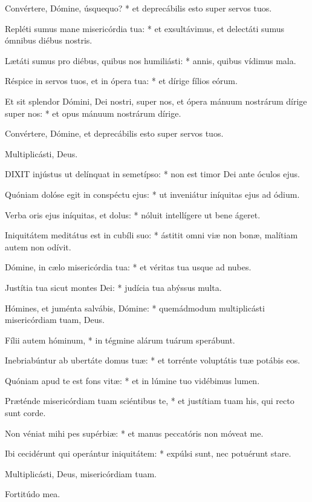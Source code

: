 Convértere, Dómine, úsquequo? * et deprecábilis esto super servos tuos.

Repléti sumus mane misericórdia tua: * et exsultávimus, et delectáti sumus ómnibus diébus nostris.

Lætáti sumus pro diébus, quibus nos humiliásti: * annis, quibus vídimus mala.

Réspice in servos tuos, et in ópera tua: * et dírige fílios eórum.

Et sit splendor Dómini, Dei nostri, super nos, et ópera mánuum nostrárum dírige super nos: * et opus mánuum nostrárum dírige.

 Convértere, Dómine, et deprecábilis esto super servos tuos.

 Multiplicásti, Deus.


\lettrine[lines=2]{D}{IXIT} injústus ut delínquat in semetípso: * non est timor Dei ante óculos ejus.

Quóniam dolóse egit in conspéctu ejus: * ut inveniátur iníquitas ejus ad ódium.

Verba oris ejus iníquitas, et dolus: * nóluit intellígere ut bene ágeret.

Iniquitátem meditátus est in cubíli suo: * ástitit omni viæ non bonæ, malítiam autem non odívit.

Dómine, in cælo misericórdia tua: * et véritas tua usque ad nubes.

Justítia tua sicut montes Dei: * judícia tua abýssus multa.

Hómines, et juménta salvábis, Dómine: * quemádmodum multiplicásti misericórdiam tuam, Deus.

Fílii autem hóminum, * in tégmine alárum tuárum sperábunt.

Inebriabúntur ab ubertáte domus tuæ: * et torrénte voluptátis tuæ potábis eos.

Quóniam apud te est fons vitæ: * et in lúmine tuo vidébimus lumen.

Præténde misericórdiam tuam sciéntibus te, * et justítiam tuam his, qui recto sunt corde.

Non véniat mihi pes supérbiæ: * et manus peccatóris non móveat me.

Ibi cecidérunt qui operántur iniquitátem: * expúlsi sunt, nec potuérunt stare.

 Multiplicásti, Deus, misericórdiam tuam.

 Fortitúdo mea.


